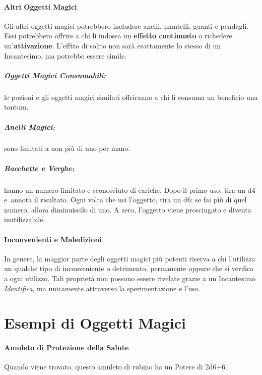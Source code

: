 \documentclass[itdr]{subfiles}
\begin{document}
\vfill

\paragraph{Altri Oggetti Magici}
Gli altri oggetti magici potrebbero includere anelli, mantelli, guanti e pendagli. Essi potrebbero offrire a chi li indossa un \textbf{effetto continuato} o richedere un'\textbf{attivazione}. L'efftto di solito non sarà esattamente lo stesso di un Incantesimo, ma potrebbe essere simile.

\vfill

\subparagraph{Oggetti Magici Consumabili:} le pozioni e gli oggetti magici similari offriranno a chi li consuma un beneficio una tantum.

\vfill

\subparagraph{Anelli Magici:} sono limitati a non più di uno per mano.

\vfill

\subparagraph{Bacchette e Verghe:} hanno un numero limitato e sconosciuto di cariche. Dopo il primo uso, tira un d4 e~annota il risultato. Ogni volta che usi l'oggetto, tira un d6: se fai pìù di quel numero, allora diminuiscilo di uno. A zero, l'oggetto viene prosciugato e diventa inutilizzabile.

\vfill

\paragraph{Inconvenienti e Maledizioni}
In genere, la maggior parte degli oggetti magici più potenti riserva a chi l'utilizza un qualche tipo di inconveniente o detrimento, \mbox{permanente} oppure che si verifica a ogni utilizzo. Tali proprietà non possono essere rivelate grazie a un Incantesimo \textit{Identifica}, ma unicamente attraverso la sperimentazione e l'uso.

\vfill
{}
\vfill
\break


\section{Esempi di Oggetti Magici}

\paragraph{Amuleto di Protezione della Salute}
Quando viene trovato, questo amuleto di rubino ha un Potere di 2d6+6.
\end{document}
